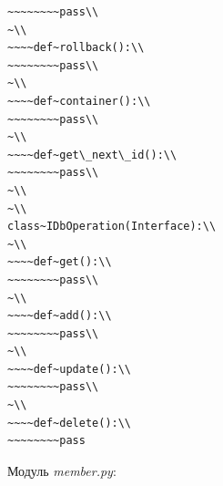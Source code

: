 \documentclass[a4paper,openany,twoside,draft]{book}
\providecommand*{\DUroletitlereference}[1]{\textsl{#1}}
\begin{document}
\begin{verbatim}
~~~~~~~~pass\\
~\\
~~~~def~rollback():\\
~~~~~~~~pass\\
~\\
~~~~def~container():\\
~~~~~~~~pass\\
~\\
~~~~def~get\_next\_id():\\
~~~~~~~~pass\\
~\\
~\\
class~IDbOperation(Interface):\\
~\\
~~~~def~get():\\
~~~~~~~~pass\\
~\\
~~~~def~add():\\
~~~~~~~~pass\\
~\\
~~~~def~update():\\
~~~~~~~~pass\\
~\\
~~~~def~delete():\\
~~~~~~~~pass
\end{verbatim}

Модуль \DUroletitlereference{member.py}:
\end{document}
